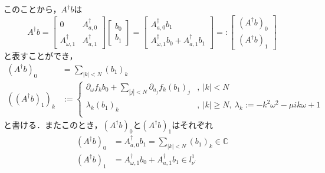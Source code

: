 \begin{dfn}
  このことから，$A^\dagger b$は
  \begin{equation*}
    A^\dagger b = \begin{bmatrix}
      0                    & A^\dagger_{a,0} \\
      A^\dagger_{\omega,1} & A^\dagger_{a,1}
    \end{bmatrix}
    \begin{bmatrix}
      b_0 \\
      b_1
    \end{bmatrix}
    = \begin{bmatrix}
      A_{a,0}^\dagger b_1 \\
      A_{\omega,1}^\dagger b_0 + A_{a,1}^\dagger b_1
    \end{bmatrix}
    =: \begin{bmatrix}
      \left(A^\dagger b\right)_0 \\
      \left(A^\dagger b\right)_1
    \end{bmatrix}
  \end{equation*}
  と表すことができ，
  \begin{align*}
    \left(A^\dagger b\right)_0                & = \sum_{|k|<N} (b_1)_k                                                                                                             \\
    \left(\left(A^\dagger b\right)_1\right)_k & := \begin{cases}
                                                     \partial_\omega f_k b_0 + \sum_{|j|<N} \partial_{a_j} f_k (b_1)_j & ,\ |k|<N                                                    \\
                                                     \lambda_k (b_1)_k                                                 & ,\ |k|\geq N,\ \lambda_k := -k^2\omega^2 - \mu ik\omega + 1 \\
                                                   \end{cases}
  \end{align*}
  と書ける．またこのとき，$(A^\dagger b)_0$と$(A^\dagger b)_1$はそれぞれ
  \begin{align*}
    \left(A^\dagger b\right)_0 & = A_{a,0}^\dagger b_1 = \sum_{|k|<N} (b_1)_k \in \mathbb{C} \\
    \left(A^\dagger b\right)_1 & = A_{\omega,1}^\dagger b_0 + A_{a,1}^\dagger b_1 \in l_{\nu^\prime}^1
  \end{align*}


\end{dfn}
